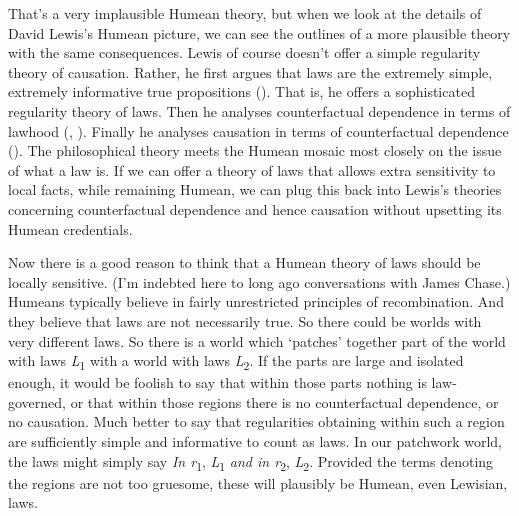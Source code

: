 \documentclass[
  10pt,
  letterpaper,
  DIV=11,
  numbers=noendperiod,
  twoside]{scrartcl}
\begin{document}
That's a very implausible Humean theory, but when we look at the details
of David Lewis's Humean picture, we can see the outlines of a more
plausible theory with the same consequences. Lewis of course doesn't
offer a simple regularity theory of causation. Rather, he first argues
that laws are the extremely simple, extremely informative true
propositions (). That is, he
offers a sophisticated regularity theory of laws. Then he analyses
counterfactual dependence in terms of lawhood
(,
). Finally he analyses causation in terms
of counterfactual dependence ().
The philosophical theory meets the Humean mosaic most closely on the
issue of what a law is. If we can offer a theory of laws that allows
extra sensitivity to local facts, while remaining Humean, we can plug
this back into Lewis's theories concerning counterfactual dependence and
hence causation without upsetting its Humean credentials.

Now there is a good reason to think that a Humean theory of laws should
be locally sensitive. (I'm indebted here to long ago conversations with
James Chase.) Humeans typically believe in fairly unrestricted
principles of recombination. And they believe that laws are not
necessarily true. So there could be worlds with very different laws. So
there is a world which `patches' together part of the world with laws
\emph{L}\textsubscript{1} with a world with laws
\emph{L}\textsubscript{2}. If the parts are large and isolated enough,
it would be foolish to say that within those parts nothing is
law-governed, or that within those regions there is no counterfactual
dependence, or no causation. Much better to say that regularities
obtaining within such a region are sufficiently simple and informative
to count as laws. In our patchwork world, the laws might simply say
\emph{In r}\textsubscript{1}, \emph{L}\textsubscript{1} \emph{and in
r}\textsubscript{2}, \emph{L}\textsubscript{2}. Provided the terms
denoting the regions are not too gruesome, these will plausibly be
Humean, even Lewisian, laws.
\end{document}
